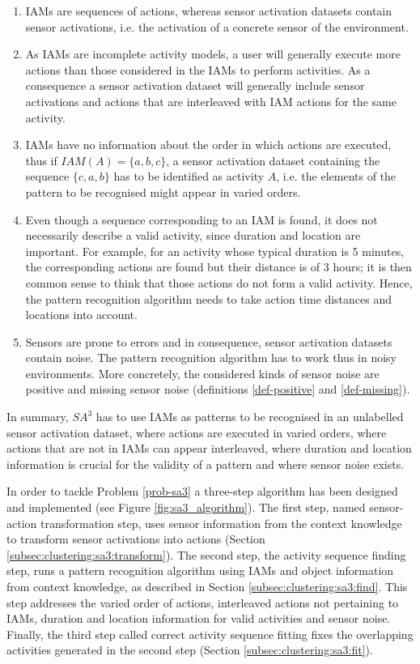 \begin{enumerate}
 \item IAMs are sequences of actions, whereas sensor activation datasets contain sensor activations, i.e. the activation of a concrete sensor of the environment.
 \item As IAMs are incomplete activity models, a user will generally execute more actions than those considered in the IAMs to perform activities. As a consequence a sensor activation dataset will generally include sensor activations and actions that are interleaved with IAM actions for the same activity.
 \item IAMs have no information about the order in which actions are executed, thus if $IAM(A) = \{a, b, c\}$, a sensor activation dataset containing the sequence $\{c, a, b\}$ has to be identified as activity $A$, i.e. the elements of the pattern to be recognised might appear in varied orders.
 \item Even though a sequence corresponding to an IAM is found, it does not necessarily describe a valid activity, since duration and location are important. For example, for an activity whose typical duration is 5 minutes, the corresponding actions are found but their distance is of 3 hours; it is then common sense to think that those actions do not form a valid activity. Hence, the pattern recognition algorithm needs to take action time distances and locations into account.
 \item Sensors are prone to errors and in consequence, sensor activation datasets contain noise. The pattern recognition algorithm has to work thus in noisy environments. More concretely, the considered kinds of sensor noise are positive and missing sensor noise (definitions \ref{def-positive} and \ref{def-missing}).
\end{enumerate}

In summary, $SA^3$ has to use IAMs as patterns to be recognised in an unlabelled sensor activation dataset, where actions are executed in varied orders, where actions that are not in IAMs can appear interleaved, where duration and location information is crucial for the validity of a pattern and where sensor noise exists. 

In order to tackle Problem \ref{prob-sa3} a three-step algorithm has been designed and implemented (see Figure \ref{fig:sa3_algorithm}). The first step, named sensor-action transformation step, uses sensor information from the context knowledge to transform sensor activations into actions (Section \ref{subsec:clustering:sa3:transform}). The second step, the activity sequence finding step, runs a pattern recognition algorithm using IAMs and object information from context knowledge, as described in Section \ref{subsec:clustering:sa3:find}. This step addresses the varied order of actions, interleaved actions not pertaining to IAMs, duration and location information for valid activities and sensor noise. Finally, the third step called correct activity sequence fitting fixes the overlapping activities generated in the second step (Section \ref{subsec:clustering:sa3:fit}).

